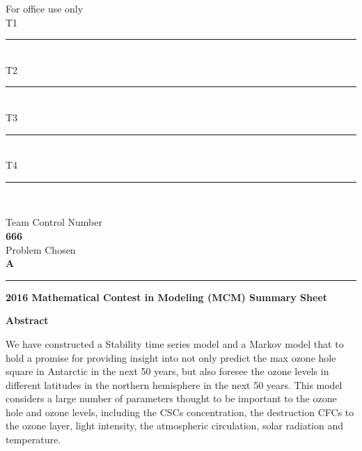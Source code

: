 \documentclass[12pt]{article}
\begin{document}

\thispagestyle{empty}
\begin{minipage}{0.3\textwidth}
\begin{flushleft}
For office use only\\
   T1\ \rule{3cm}{0.5pt}\\
   T2\ \rule{3cm}{0.5pt}\\
   T3\ \rule{3cm}{0.5pt}\\
   T4\ \rule{3cm}{0.5pt}\\
\end{flushleft}
\end{minipage}\hspace{\fill}
\begin{minipage}{0.3\textwidth}
\centering
Team Control Number\\[5pt]
\fontsize{30pt}{\baselineskip}\selectfont  \textbf{666} \normalsize\\[10pt]
Problem Chosen\\[5pt]
\fontsize{18pt}{\baselineskip}\selectfont \textbf{A}\normalsize\\
\end{minipage}\hfill
\begin{minipage}{0.35\textwidth}
\begin{flushright}
\end{flushright}
\end{minipage}\vspace*{10pt}
\rule{\textwidth}{0.5pt}

\begin{center}
  \textbf{2016 Mathematical Contest in Modeling (MCM) Summary Sheet}
\end{center}
\noindent
{\Large \textbf{Abstract}}
\vspace{7pt}

We have constructed a Stability time series model and a Markov model that to hold a promise for providing insight into not only predict the max ozone hole square in Antarctic in the next 50 years, but also foresee the ozone levels in different latitudes in the northern hemisphere in the next 50 years. This model considers a large number of parameters thought to be important to the ozone hole and ozone levels, including the CSCs concentration, the destruction CFCs to the ozone layer, light intensity, the atmospheric circulation, solar radiation and temperature. 
\end{document}
